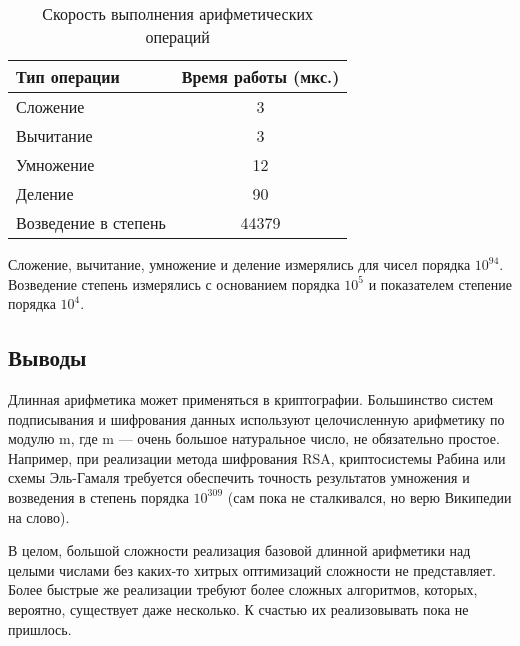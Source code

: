 \documentclass[12pt]{article}
\begin{document}
\begin{table}[H]
\caption{Скорость выполнения арифметических операций}
\label{tabular:timesandtenses}
\begin{center}
\begin{tabular}{|l|c|}
\hline
\textbf{Тип операции} & \textbf{Время работы (мкс.)} \\
\hline
Сложение & 3 \\
\hline
Вычитание & 3 \\
\hline
Умножение & 12 \\
\hline
Деление & 90 \\
\hline
Возведение в степень & 44379 \\
\hline
\end{tabular}
\end{center}
\end{table}

Сложение, вычитание, умножение и деление измерялись для чисел порядка $10^{94}$.
Возведение степень измерялись с основанием порядка $10^5$ и показателем степение порядка $10^4$.

\subsection*{Выводы}

Длинная арифметика может применяться в криптографии. Большинство систем подписывания и шифрования данных используют целочисленную арифметику по модулю m, где m — очень большое натуральное число, не обязательно простое. Например, при реализации метода шифрования RSA, криптосистемы Рабина или схемы Эль-Гамаля требуется обеспечить точность результатов умножения и возведения в степень порядка $10^{309}$ (сам пока не сталкивался, но верю Википедии на слово).

В целом, большой сложности реализация базовой длинной арифметики над целыми числами без каких-то хитрых оптимизаций сложности не представляет. Более быстрые же реализации требуют более сложных алгоритмов, которых, вероятно, существует даже несколько. К счастью их реализовывать пока не пришлось.
\end{document}
